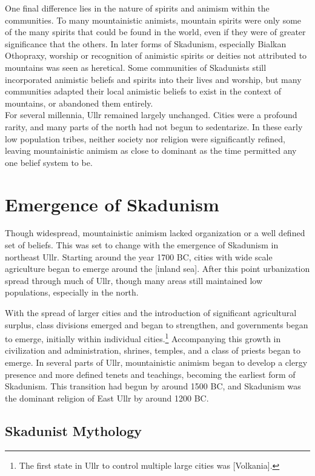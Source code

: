 One final difference lies in the nature of spirits and animism within the communities. To many mountainistic animists, mountain spirits were only some of the many spirits that could be found in the world, even if they were of greater significance that the others. In later forms of Skadunism, especially Bialkan Othopraxy, worship or recognition of animistic spirits or deities not attributed to mountains was seen as heretical. Some communities of Skadunists still incorporated animistic beliefs and spirits into their lives and worship, but many communities adapted their local animistic beliefs to exist in the context of mountains, or abandoned them entirely. \\
 
For several millennia, Ullr remained largely unchanged. Cities were a profound rarity, and many parts of the north had not begun to sedentarize. In these early low population tribes, neither society nor religion were significantly refined, leaving mountainistic animism as close to dominant as the time permitted any one belief system to be.
 
\section{Emergence of Skadunism}

Though widespread, mountainistic animism lacked organization or a well defined set of beliefs. This was set to change with the emergence of Skadunism in northeast Ullr. Starting around the year 1700 BC, cities with wide scale agriculture began to emerge around the [inland sea]. After this point urbanization spread through much of Ullr, though many areas still maintained low populations, especially in the north.

With the spread of larger cities and the introduction of significant agricultural surplus, class divisions emerged and began to strengthen, and governments began to emerge, initially within individual cities.\footnote{The first state in Ullr to control multiple large cities was [Volkania].} Accompanying this growth in civilization and administration, shrines, temples, and a class of priests began to emerge. In several parts of Ullr, mountainistic animism began to develop a clergy presence and more defined tenets and teachings, becoming the earliest form of Skadunism. This transition had begun by around 1500 BC, and Skadunism was the dominant religion of East Ullr by around 1200 BC. 

\subsection{Skadunist Mythology}

